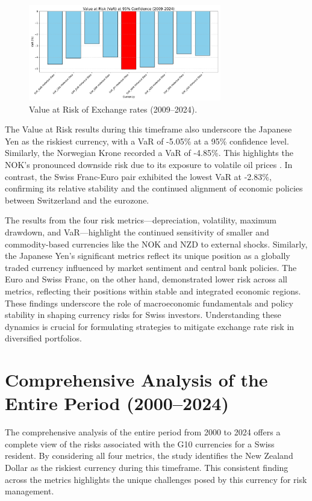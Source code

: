 \documentclass[11pt,a4paper,english,oneside]{book}
\begin{document}
\begin{figure}[h!]
    \centering
    \includegraphics[width=0.75\textwidth]{../../images/var_2009_2024.pdf}
    \caption{Value at Risk of Exchange rates (2009--2024).}
    \label{fig:var_2009_2024}
\end{figure}

The Value at Risk results during this timeframe also underscore the Japanese Yen as the riskiest currency, with a VaR of -5.05\% at a 95\% confidence level. Similarly, the Norwegian Krone recorded a VaR of -4.85\%. This highlights the NOK's pronounced downside risk due to its exposure to volatile oil prices \parencite{bergholt2016business}. In contrast, the Swiss Franc-Euro pair exhibited the lowest VaR at -2.83\%, confirming its relative stability and the continued alignment of economic policies between Switzerland and the eurozone.

The results from the four risk metrics—depreciation, volatility, maximum drawdown, and VaR—highlight the continued sensitivity of smaller and commodity-based currencies like the NOK and NZD to external shocks. Similarly, the Japanese Yen's significant metrics reflect its unique position as a globally traded currency influenced by market sentiment and central bank policies. The Euro and Swiss Franc, on the other hand, demonstrated lower risk across all metrics, reflecting their positions within stable and integrated economic regions. These findings underscore the role of macroeconomic fundamentals and policy stability in shaping currency risks for Swiss investors. Understanding these dynamics is crucial for formulating strategies to mitigate exchange rate risk in diversified portfolios.

\section{Comprehensive Analysis of the Entire Period (2000–2024)}
The comprehensive analysis of the entire period from 2000 to 2024 offers a complete view of the risks associated with the G10 currencies for a Swiss resident. By considering all four metrics, the study identifies the New Zealand Dollar as the riskiest currency during this timeframe. This consistent finding across the metrics highlights the unique challenges posed by this currency for risk management.
\end{document}

